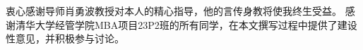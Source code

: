 
\begin{acknowledgements}
  衷心感谢导师肖勇波教授对本人的精心指导，他的言传身教将使我终生受益。
  感谢清华大学经管学院MBA项目23P2班的所有同学，在本文撰写过程中提供了建设性意见，并积极参与讨论。

\end{acknowledgements}
